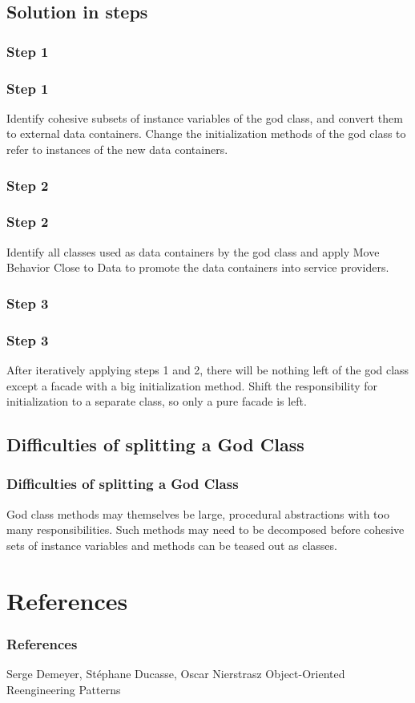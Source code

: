 \documentclass{beamer}
\begin{document}
\subsection{Solution in steps}
\subsubsection{Step 1}
\begin{frame}
\frametitle{Step 1}
Identify cohesive subsets of instance variables of the god class, and convert them to external data containers. Change the initialization methods of the god class to refer to instances of the new data containers.
\end{frame}
\subsubsection{Step 2}
\begin{frame}
\frametitle{Step 2}
Identify all classes used as data containers by the god class and apply Move Behavior Close to Data to promote the data containers into service providers.
\end{frame}
\subsubsection{Step 3}
\begin{frame}
\frametitle{Step 3}
After iteratively applying steps 1 and 2, there will be nothing left of the god class except a facade with a big initialization method. Shift the responsibility for initialization to a separate class, so only a pure facade is left.
\end{frame}
\subsection{Difficulties of splitting a God Class}
\begin{frame}
\frametitle{Difficulties of splitting a God Class}
God class methods may themselves be large, procedural abstractions with too many responsibilities. Such methods may need to be decomposed before cohesive sets of instance variables and methods can be teased out as classes.
\end{frame}

\section{References}
\begin{frame}
\frametitle{References}
\footnotesize{
\begin{thebibliography}{99} %
 Serge Demeyer, Stéphane Ducasse, Oscar Nierstrasz
\newblock Object-Oriented Reengineering Patterns

\end{thebibliography}
}
\end{frame}
\end{document}
